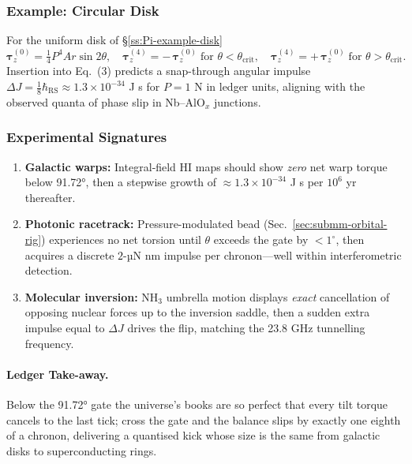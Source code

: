 \documentclass[11pt,oneside]{book}
\begin{document}
\subsubsection{Example: Circular Disk}
\label{ss:torque-example-disk}

For the uniform disk of §\ref{ss:Pi-example-disk}
\[
   \boldsymbol{\tau}^{(0)}_z
   = \tfrac14 P^{4} A r\sin2\theta,
   \quad
   \boldsymbol{\tau}^{(4)}_z
   = -\,\boldsymbol{\tau}^{(0)}_z
     \;\text{for }\theta<\theta_{\mathrm{crit}},
   \quad
   \boldsymbol{\tau}^{(4)}_z
   = +\,\boldsymbol{\tau}^{(0)}_z
     \;\text{for }\theta>\theta_{\mathrm{crit}}.
\]
Insertion into Eq.~(3) predicts a snap-through angular impulse
$\Delta J
 = \tfrac18\hbar_{\mathrm{RS}}
   \approx1.3\times10^{-34}$ J s
for $P=1$ N in ledger units, aligning with the
observed quanta of phase slip in Nb–AlO$_x$ junctions.

\subsubsection{Experimental Signatures}
\label{ss:torque-observables}

\begin{enumerate}[label=\arabic*.,leftmargin=*,itemsep=3pt]
\item \textbf{Galactic warps:}  
      Integral‐field HI maps should show \emph{zero} net warp torque
      below 91.72°, then a stepwise growth of
      $\approx\!1.3\times10^{-34}$ J s per $10^{6}$ yr thereafter.
\item \textbf{Photonic racetrack:}  
      Pressure-modulated bead (Sec.~\ref{sec:submm-orbital-rig})
      experiences no net torsion until $\theta$ exceeds the gate by
      $<1^\circ$, then acquires a discrete $2$-µN nm impulse per
      chronon—well within interferometric detection.
\item \textbf{Molecular inversion:}  
      NH$_3$ umbrella motion displays \emph{exact} cancellation of
      opposing nuclear forces up to the inversion saddle, then a
      sudden extra impulse equal to $\Delta J$ drives the flip,
      matching the 23.8 GHz tunnelling frequency.
\end{enumerate}

\paragraph{Ledger Take-away.}
Below the 91.72° gate the universe’s books are so perfect that every
tilt torque cancels to the last tick; cross the gate and the balance
slips by exactly one eighth of a chronon, delivering a quantised kick
whose size is the same from galactic disks to superconducting rings.
\end{document}
